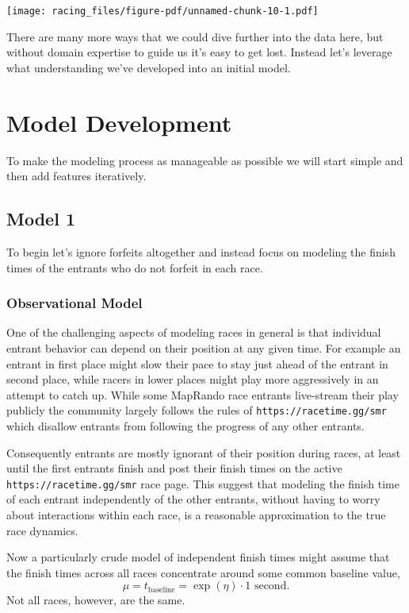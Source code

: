 \documentclass[
  letterpaper,
  DIV=11,
  numbers=noendperiod]{scrartcl}
\begin{document}
\texttt{[image: racing\_files/figure-pdf/unnamed-chunk-10-1.pdf]}

There are many more ways that we could dive further into the data here,
but without domain expertise to guide us it's easy to get lost. Instead
let's leverage what understanding we've developed into an initial model.

\section{Model Development}\label{model-development}

To make the modeling process as manageable as possible we will start
simple and then add features iteratively.

\subsection{Model 1}\label{model-1}

To begin let's ignore forfeits altogether and instead focus on modeling
the finish times of the entrants who do not forfeit in each race.

\subsubsection{Observational Model}\label{observational-model}

One of the challenging aspects of modeling races in general is that
individual entrant behavior can depend on their position at any given
time. For example an entrant in first place might slow their pace to
stay just ahead of the entrant in second place, while racers in lower
places might play more aggressively in an attempt to catch up. While
some MapRando race entrants live-stream their play publicly the
community largely follows the rules of \texttt{https://racetime.gg/smr}
which disallow entrants from following the progress of any other
entrants.

Consequently entrants are mostly ignorant of their position during
races, at least until the first entrants finish and post their finish
times on the active \texttt{https://racetime.gg/smr} race page. This
suggest that modeling the finish time of each entrant independently of
the other entrants, without having to worry about interactions within
each race, is a reasonable approximation to the true race dynamics.

Now a particularly crude model of independent finish times might assume
that the finish times across all races concentrate around some common
baseline value, \[
\mu = t_{\mathrm{baseline}} = \exp(\eta) \cdot 1 \text{ second}.
\] Not all races, however, are the same.
\end{document}
